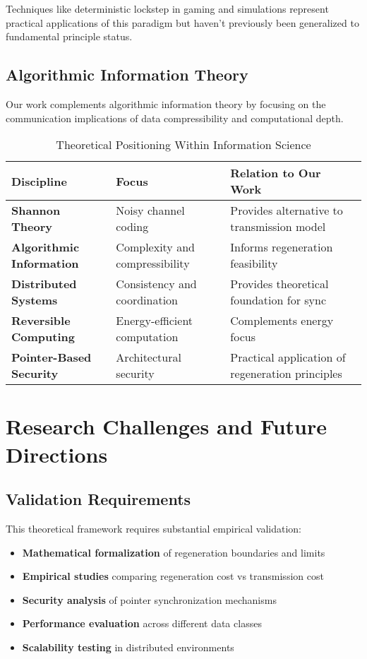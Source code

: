 \documentclass[11pt,a4paper]{article}
\begin{document}
Techniques like deterministic lockstep in gaming and simulations represent practical applications of this paradigm but haven't previously been generalized to fundamental principle status.

\subsection{Algorithmic Information Theory}

Our work complements algorithmic information theory by focusing on the communication implications of data compressibility and computational depth.

\begin{table}[h]
\centering
\caption{Theoretical Positioning Within Information Science}
\begin{tabularx}{\textwidth}{|l|X|X|}
\hline
\textbf{Discipline} & \textbf{Focus} & \textbf{Relation to Our Work} \\
\hline
\textbf{Shannon Theory} & Noisy channel coding & Provides alternative to transmission model \\
\hline
\textbf{Algorithmic Information} & Complexity and compressibility & Informs regeneration feasibility \\
\hline
\textbf{Distributed Systems} & Consistency and coordination & Provides theoretical foundation for sync \\
\hline
\textbf{Reversible Computing} & Energy-efficient computation & Complements energy focus \\
\hline
\textbf{Pointer-Based Security} & Architectural security & Practical application of regeneration principles \\
\hline
\end{tabularx}
\end{table}

\section{Research Challenges and Future Directions}

\subsection{Validation Requirements}

This theoretical framework requires substantial empirical validation:

\begin{itemize}
    \item \textbf{Mathematical formalization} of regeneration boundaries and limits
    \item \textbf{Empirical studies} comparing regeneration cost vs transmission cost
    \item \textbf{Security analysis} of pointer synchronization mechanisms
    \item \textbf{Performance evaluation} across different data classes
    \item \textbf{Scalability testing} in distributed environments
\end{itemize}
\end{document}
